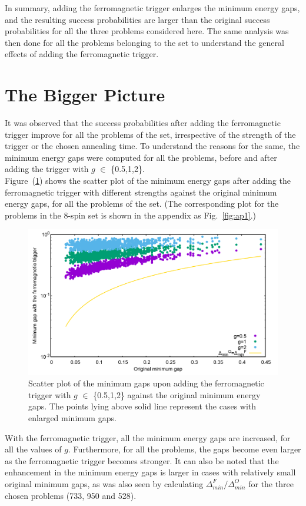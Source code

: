 \documentclass[../main.tex]{subfiles}
\begin{document}
In summary, adding the ferromagnetic trigger enlarges the minimum energy gaps, and the resulting success probabilities are larger than the original success probabilities for all the three problems considered here. The same analysis was then done for all the problems belonging to the set to understand the general effects of adding the ferromagnetic trigger.

\section{The Bigger Picture}
It was observed that the success probabilities after adding the ferromagnetic trigger improve for all the problems of the set, irrespective of the strength of the trigger or the chosen annealing time. To understand the reasons for the same, the minimum energy gaps were computed for all the problems, before and after adding the trigger with $g$ $\in$ \{0.5,1,2\}. \\

Figure~(\ref{fig:f10}) shows the scatter plot of the minimum energy gaps after adding the ferromagnetic trigger with different strengths against the original minimum energy gaps, for all the problems of the set. (The corresponding plot for the problems in the 8-spin set is shown in the appendix as Fig.~\ref{fig:ap1}.)

\begin{figure}[H]
\centering 
\includegraphics[scale=0.2]{Mingap_F_g0_1_2.png}
\caption{Scatter plot of the minimum gaps upon adding the ferromagnetic trigger with $g$ $\in$ \{0.5,1,2\} against the original minimum energy gaps. The points lying above solid line represent the cases with enlarged minimum gaps.}
\label{fig:f10}
\end{figure}
With the ferromagnetic trigger, all the minimum energy gaps are increased, for  all the values of $g$. Furthermore, for all the problems, the gaps become even larger as the ferromagnetic trigger becomes stronger. It can also be noted that the enhancement in the minimum energy gaps is larger in cases with relatively small original minimum gaps, as was also seen by calculating $\Delta_{min}^F/\Delta_{min}^O$ for the three chosen problems (733, 950 and 528). 
\end{document}
